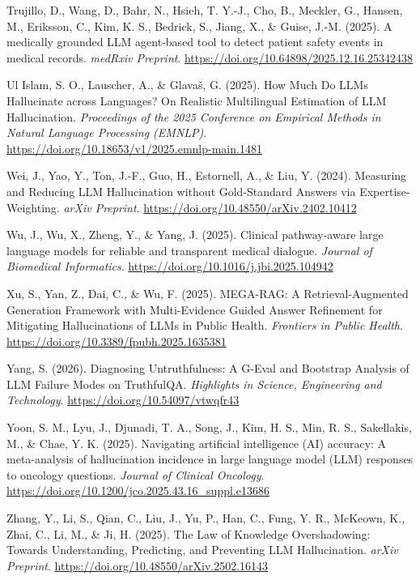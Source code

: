 \documentclass[
  11pt,
  a4paper,
]{article}
\newlength{\cslhangindent}
\newenvironment{CSLReferences}[2] %
 {\begin{list}{}{%
  \setlength{\itemindent}{0pt}
  \setlength{\leftmargin}{0pt}
  \setlength{\parsep}{0pt}
  \ifodd #1
   \setlength{\leftmargin}{\cslhangindent}
   \setlength{\itemindent}{-1\cslhangindent}
  \fi
  \setlength{\itemsep}{#2\baselineskip}}}
 {\end{list}}
\begin{document}
\begin{CSLReferences}{1}{0}
Trujillo, D., Wang, D., Bahr, N., Hsieh, T. Y.-J., Cho, B., Meckler, G.,
Hansen, M., Eriksson, C., Kim, K. S., Bedrick, S., Jiang, X., \& Guise,
J.-M. (2025). {A medically grounded LLM agent-based tool to detect
patient safety events in medical records}. \emph{medRxiv Preprint}.
\url{https://doi.org/10.64898/2025.12.16.25342438}

Ul Islam, S. O., Lauscher, A., \& Glavaš, G. (2025). {How Much Do LLMs
Hallucinate across Languages? On Realistic Multilingual Estimation of
LLM Hallucination}. \emph{Proceedings of the 2025 Conference on
Empirical Methods in Natural Language Processing (EMNLP)}.
\url{https://doi.org/10.18653/v1/2025.emnlp-main.1481}

Wei, J., Yao, Y., Ton, J.-F., Guo, H., Estornell, A., \& Liu, Y. (2024).
{Measuring and Reducing LLM Hallucination without Gold-Standard Answers
via Expertise-Weighting}. \emph{arXiv Preprint}.
\url{https://doi.org/10.48550/arXiv.2402.10412}

Wu, J., Wu, X., Zheng, Y., \& Yang, J. (2025). {Clinical pathway-aware
large language models for reliable and transparent medical dialogue}.
\emph{Journal of Biomedical Informatics}.
\url{https://doi.org/10.1016/j.jbi.2025.104942}

Xu, S., Yan, Z., Dai, C., \& Wu, F. (2025). {MEGA-RAG: A
Retrieval-Augmented Generation Framework with Multi-Evidence Guided
Answer Refinement for Mitigating Hallucinations of LLMs in Public
Health}. \emph{Frontiers in Public Health}.
\url{https://doi.org/10.3389/fpubh.2025.1635381}

Yang, S. (2026). {Diagnosing Untruthfulness: A G-Eval and Bootstrap
Analysis of LLM Failure Modes on TruthfulQA}. \emph{Highlights in
Science, Engineering and Technology}.
\url{https://doi.org/10.54097/vtwqfr43}

Yoon, S. M., Lyu, J., Djunadi, T. A., Song, J., Kim, H. S., Min, R. S.,
Sakellakis, M., \& Chae, Y. K. (2025). {Navigating artificial
intelligence (AI) accuracy: A meta-analysis of hallucination incidence
in large language model (LLM) responses to oncology questions}.
\emph{Journal of Clinical Oncology}.
\url{https://doi.org/10.1200/jco.2025.43.16_suppl.e13686}

Zhang, Y., Li, S., Qian, C., Liu, J., Yu, P., Han, C., Fung, Y. R.,
McKeown, K., Zhai, C., Li, M., \& Ji, H. (2025). {The Law of Knowledge
Overshadowing: Towards Understanding, Predicting, and Preventing LLM
Hallucination}. \emph{arXiv Preprint}.
\url{https://doi.org/10.48550/arXiv.2502.16143}

\end{CSLReferences}
\end{document}
